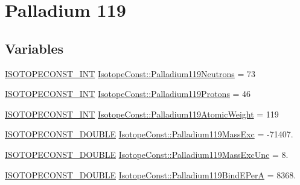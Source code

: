 \hypertarget{group___isotope_const-_palladium-_pd119}{}\section{Palladium 119}
\label{group___isotope_const-_palladium-_pd119}
\subsection*{Variables}
\begin{DoxyCompactItemize}
\item 
\mbox{\hyperlink{group___isotope_const-_macros_ga5f18360b3e99483a35c32d789e62621c}{I\+S\+O\+T\+O\+P\+E\+C\+O\+N\+S\+T\+\_\+\+I\+NT}} \mbox{\hyperlink{group___isotope_const-_palladium-_pd119_gaf323475ee1b2456674dfdb34ee3aa26b}{Isotope\+Const\+::\+Palladium119\+Neutrons}} = 73
\item 
\mbox{\hyperlink{group___isotope_const-_macros_ga5f18360b3e99483a35c32d789e62621c}{I\+S\+O\+T\+O\+P\+E\+C\+O\+N\+S\+T\+\_\+\+I\+NT}} \mbox{\hyperlink{group___isotope_const-_palladium-_pd119_gaace87b8323b41ea2abd83522d9729a9e}{Isotope\+Const\+::\+Palladium119\+Protons}} = 46
\item 
\mbox{\hyperlink{group___isotope_const-_macros_ga5f18360b3e99483a35c32d789e62621c}{I\+S\+O\+T\+O\+P\+E\+C\+O\+N\+S\+T\+\_\+\+I\+NT}} \mbox{\hyperlink{group___isotope_const-_palladium-_pd119_ga71f405cf04deb17b35e259ecd640103e}{Isotope\+Const\+::\+Palladium119\+Atomic\+Weight}} = 119
\item 
\mbox{\hyperlink{group___isotope_const-_macros_ga8f45a7272ce02c0b4c65c44636ed719a}{I\+S\+O\+T\+O\+P\+E\+C\+O\+N\+S\+T\+\_\+\+D\+O\+U\+B\+LE}} \mbox{\hyperlink{group___isotope_const-_palladium-_pd119_ga68a420347c7b17585263f21ae209e288}{Isotope\+Const\+::\+Palladium119\+Mass\+Exc}} = -\/71407.
\item 
\mbox{\hyperlink{group___isotope_const-_macros_ga8f45a7272ce02c0b4c65c44636ed719a}{I\+S\+O\+T\+O\+P\+E\+C\+O\+N\+S\+T\+\_\+\+D\+O\+U\+B\+LE}} \mbox{\hyperlink{group___isotope_const-_palladium-_pd119_ga58e3d4bc649b297a4511cd073af84ca7}{Isotope\+Const\+::\+Palladium119\+Mass\+Exc\+Unc}} = 8.
\item 
\mbox{\hyperlink{group___isotope_const-_macros_ga8f45a7272ce02c0b4c65c44636ed719a}{I\+S\+O\+T\+O\+P\+E\+C\+O\+N\+S\+T\+\_\+\+D\+O\+U\+B\+LE}} \mbox{\hyperlink{group___isotope_const-_palladium-_pd119_ga2b0a8fd5544eb2a34c2f66d72585ea8b}{Isotope\+Const\+::\+Palladium119\+Bind\+E\+PerA}} = 8368.
\item 

\end{DoxyCompactItemize}
